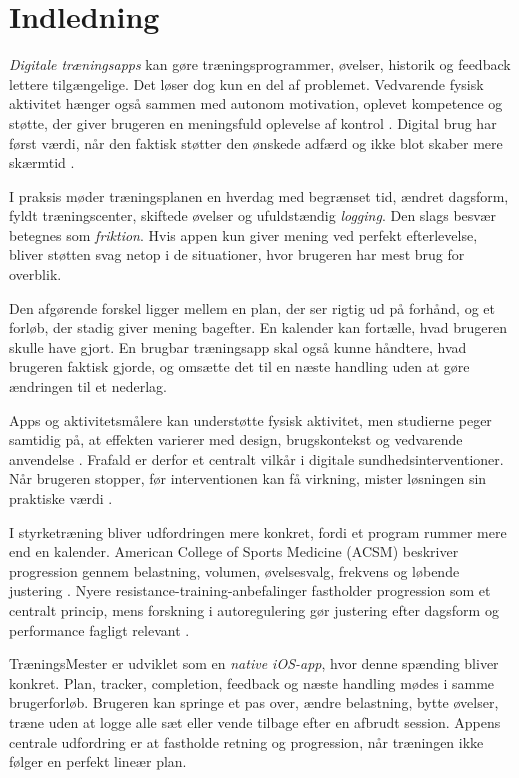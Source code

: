\section{Indledning}

\emph{Digitale træningsapps} kan gøre træningsprogrammer, øvelser, historik og feedback lettere tilgængelige. Det løser dog kun en del af problemet. Vedvarende fysisk aktivitet hænger også sammen med autonom motivation, oplevet kompetence og støtte, der giver brugeren en meningsfuld oplevelse af kontrol \cite{teixeira2012_sdt_exercise}. Digital brug har først værdi, når den faktisk støtter den ønskede adfærd og ikke blot skaber mere skærmtid \cite{yardley2016_effective_engagement_dbci}.

I praksis møder træningsplanen en hverdag med begrænset tid, ændret dagsform, fyldt træningscenter, skiftede øvelser og ufuldstændig \emph{logging}. Den slags besvær betegnes som \emph{friktion}. Hvis appen kun giver mening ved perfekt efterlevelse, bliver støtten svag netop i de situationer, hvor brugeren har mest brug for overblik.

Den afgørende forskel ligger mellem en plan, der ser rigtig ud på forhånd, og et forløb, der stadig giver mening bagefter. En kalender kan fortælle, hvad brugeren skulle have gjort. En brugbar træningsapp skal også kunne håndtere, hvad brugeren faktisk gjorde, og omsætte det til en næste handling uden at gøre ændringen til et nederlag.

Apps og aktivitetsmålere kan understøtte fysisk aktivitet, men studierne peger samtidig på, at effekten varierer med design, brugskontekst og vedvarende anvendelse \cite{laranjo2021_apps_trackers_meta,romeo2019_smartphone_apps_pa_meta,brickwood2019_wearable_trackers_meta}. Frafald er derfor et centralt vilkår i digitale sundhedsinterventioner. Når brugeren stopper, før interventionen kan få virkning, mister løsningen sin praktiske værdi \cite{eysenbach2005_law_of_attrition}.

I styrketræning bliver udfordringen mere konkret, fordi et program rummer mere end en kalender. American College of Sports Medicine (ACSM) beskriver progression gennem belastning, volumen, øvelsesvalg, frekvens og løbende justering \cite{acsm2009_progression_models}. Nyere resistance-training-anbefalinger fastholder progression som et centralt princip, mens forskning i autoregulering gør justering efter dagsform og performance fagligt relevant \cite{currier2026_acsm_resistance_training,greig2020_autoregulation_resistance_training,larsen2021_autoregulation_systematic_review}.

TræningsMester er udviklet som en \emph{native iOS-app}, hvor denne spænding bliver konkret. Plan, tracker, completion, feedback og næste handling mødes i samme brugerforløb. Brugeren kan springe et pas over, ændre belastning, bytte øvelser, træne uden at logge alle sæt eller vende tilbage efter en afbrudt session. Appens centrale udfordring er at fastholde retning og progression, når træningen ikke følger en perfekt lineær plan.

